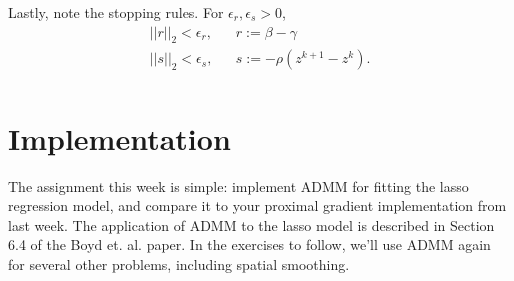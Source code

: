 \documentclass{article}
\begin{document}
Lastly, note the stopping rules.  For $\epsilon_r,\epsilon_s > 0$,
\begin{eqnarray*}
||r||_2 < \epsilon_r ,&& r := \beta - \gamma \\
||s||_2 < \epsilon_s ,&& s := -\rho(z^{k+1} - z^k).  \\
\end{eqnarray*}

\section{Implementation}
The assignment this week is simple: implement ADMM for fitting the lasso regression model, and compare it to your proximal gradient implementation from last week. The application of ADMM to the lasso model is described in Section 6.4 of the Boyd et. al. paper.
In the exercises to follow, we'll use ADMM again for several other problems, including spatial smoothing.
\end{document}
